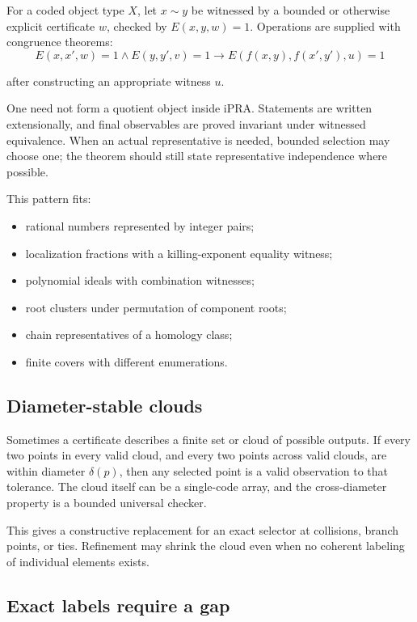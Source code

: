 For a coded object type \(X\), let \(x\sim y\) be witnessed by a bounded or
otherwise explicit certificate \(w\), checked by
\(E(x,y,w)=1\).  Operations are supplied with congruence theorems:
\[
 E(x,x',w)=1\wedge E(y,y',v)=1
 \to E(f(x,y),f(x',y'),u)=1
\]

after constructing an appropriate witness \(u\).

One need not form a quotient object inside iPRA.  Statements are written
extensionally, and final observables are proved invariant under witnessed
equivalence.  When an actual representative is needed, bounded selection may
choose one; the theorem should still state representative independence where
possible.

This pattern fits:

\begin{itemize}
\item rational numbers represented by integer pairs;
\item localization fractions with a killing-exponent equality witness;
\item polynomial ideals with combination witnesses;
\item root clusters under permutation of component roots;
\item chain representatives of a homology class;
\item finite covers with different enumerations.
\end{itemize}

\subsection{Diameter-stable clouds}

Sometimes a certificate describes a finite set or cloud of possible outputs.
If every two points in every valid cloud, and every two points across valid
clouds, are within diameter \(\delta(p)\), then any selected point is a valid
observation to that tolerance.  The cloud itself can be a single-code array,
and the cross-diameter property is a bounded universal checker.

This gives a constructive replacement for an exact selector at collisions,
branch points, or ties.  Refinement may shrink the cloud even when no coherent
labeling of individual elements exists.

\subsection{Exact labels require a gap}

